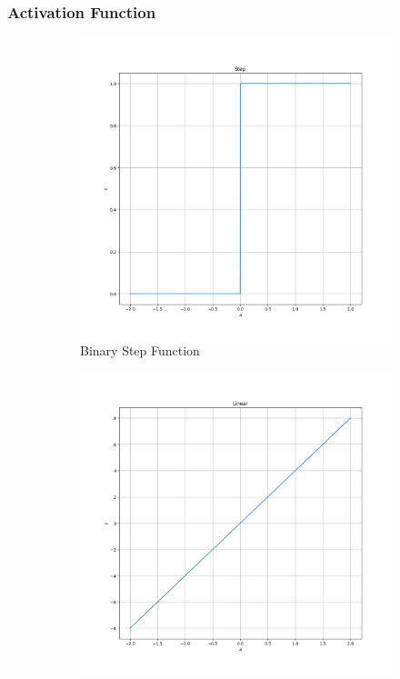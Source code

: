 \subsubsection{Activation Function}
\begin{figure}
	\centering
	\begin{subfigure}{0.24\linewidth}
		\includegraphics[width=\linewidth]{figures/step.png}
		\caption{Binary Step Function}
	\end{subfigure}
	\begin{subfigure}{0.24\linewidth}
		\includegraphics[width=\linewidth]{figures/linear.png}

\end{subfigure}
\end{figure}
